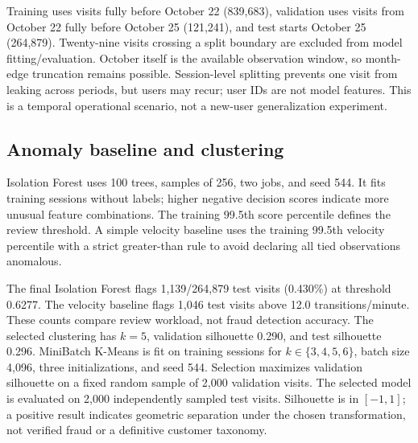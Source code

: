 \documentclass[conference]{IEEEtran}
\begin{document}
Training uses visits fully before October 22 (839,683), validation uses visits from October 22 fully before October 25 (121,241), and test starts October 25 (264,879). Twenty-nine visits crossing a split boundary are excluded from model fitting/evaluation. October itself is the available observation window, so month-edge truncation remains possible. Session-level splitting prevents one visit from leaking across periods, but users may recur; user IDs are not model features. This is a temporal operational scenario, not a new-user generalization experiment.

\subsection{Anomaly baseline and clustering}
Isolation Forest uses 100 trees, samples of 256, two jobs, and seed 544. It fits training sessions without labels; higher negative decision scores indicate more unusual feature combinations. The training 99.5th score percentile defines the review threshold. A simple velocity baseline uses the training 99.5th velocity percentile with a strict greater-than rule to avoid declaring all tied observations anomalous.

The final Isolation Forest flags 1,139/264,879 test visits (0.430\%) at threshold 0.6277. The velocity baseline flags 1,046 test visits above 12.0 transitions/minute. These counts compare review workload, not fraud detection accuracy. The selected clustering has $k=5$, validation silhouette 0.290, and test silhouette 0.296.
MiniBatch K-Means is fit on training sessions for $k\in\{3,4,5,6\}$, batch size 4,096, three initializations, and seed 544. Selection maximizes validation silhouette on a fixed random sample of 2,000 validation visits. The selected model is evaluated on 2,000 independently sampled test visits. Silhouette is in $[-1,1]$; a positive result indicates geometric separation under the chosen transformation, not verified fraud or a definitive customer taxonomy.
\end{document}
